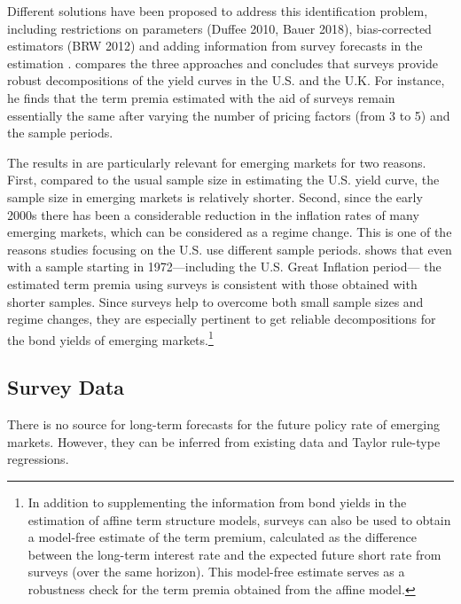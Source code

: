 {Different solutions have been proposed to address this identification problem, including restrictions on parameters (Duffee 2010, Bauer 2018), bias-corrected estimators (BRW 2012) and adding information from survey forecasts in the estimation \citep{KimWright:2005,KimOrphanides:2012,Guimaraes:2014}.
\cite{Guimaraes:2014} compares the three approaches and concludes that surveys provide robust decompositions of the yield curves in the U.S. and the U.K. For instance, he finds that the term premia estimated with the aid of surveys remain essentially the same after varying the number of pricing factors (from 3 to 5) and the sample periods.

The results in \cite{Guimaraes:2014} are particularly relevant for emerging markets for two reasons. 
First, compared to the usual sample size in estimating the U.S. yield curve, the sample size in emerging markets is relatively shorter.
Second, since the early 2000s there has been a considerable reduction in the inflation rates of many emerging markets, which can be considered as a regime change. 
This is one of the reasons studies focusing on the U.S. use different sample periods.
\cite{Guimaraes:2014} shows that even with a sample starting in 1972---including the U.S. Great Inflation period--- the estimated term premia using surveys is consistent with those obtained with shorter samples.
Since surveys help to overcome both small sample sizes and regime changes, they are especially pertinent to get reliable decompositions for the bond yields of emerging markets.\footnote{ In addition to supplementing the information from bond yields in the estimation of affine term structure models, surveys can also be used to obtain a model-free estimate of the term premium, calculated as the difference between the long-term interest rate and the expected future short rate from surveys (over the same horizon). This model-free estimate serves as a robustness check for the term premia obtained from the affine model.}
 

\subsection{Survey Data} \label{sec:SurveyData}
\iftoggle{toclinks}{\gototoc}{} %

There is no source for long-term forecasts for the future policy rate of emerging markets. However, they can be inferred from existing data and Taylor rule-type regressions.

}
